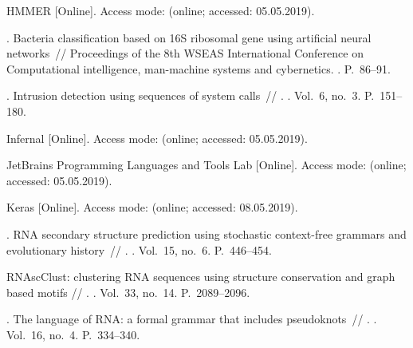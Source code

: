 \begin{thebibliography}{10}
HMMER [Online]. \BibDash
\newblock Access mode:  (online; accessed:
  05.05.2019).

. Bacteria
  classification based on 16S ribosomal gene using artificial neural
  networks~// Proceedings of the 8th WSEAS International Conference on
  Computational intelligence, man-machine systems and cybernetics. \BibDash
{}. \BibDash
\newblock P.~86--91.

. Intrusion
  detection using sequences of system calls~// . \BibDash
{}. \BibDash
\newblock Vol.~6, no.~3. \BibDash
\newblock P.~151--180.

Infernal [Online]. \BibDash
\newblock Access mode:  (online; accessed:
  05.05.2019).

JetBrains Programming Languages and Tools Lab [Online]. \BibDash
\newblock Access mode: 
  (online; accessed: 05.05.2019).

Keras [Online]. \BibDash
\newblock Access mode:  (online; accessed:
  08.05.2019).

. RNA secondary structure prediction using
  stochastic context-free grammars and evolutionary history~//
  . \BibDash
{}. \BibDash
\newblock Vol.~15, no.~6. \BibDash
\newblock P.~446--454.

RNAscClust: clustering RNA sequences using structure conservation and graph
  based motifs //
  . \BibDash
{}. \BibDash
\newblock Vol.~33, no.~14. \BibDash
\newblock P.~2089--2096.

. The language of RNA: a formal grammar that
  includes pseudoknots~// . \BibDash
{}. \BibDash
\newblock Vol.~16, no.~4. \BibDash
\newblock P.~334--340.


\end{thebibliography}

